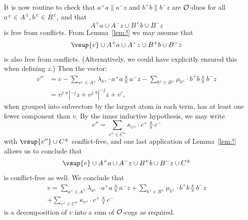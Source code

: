 \begin{claimproof}
It is now routine to check that $a^+ a \parallel a^- z$ and $b^+ b \parallel b^- z$ are $\cal O$-duos for all $a^\pm \in A^\pm, b^\pm \in B^\pm$,
and that 
\[
A^+ a \cup A^- z \cup B^+ b \cup B^- z
\]
is free from conflicts.
From Lemma~\ref{lem:!} we may assume that 
\[
\vsup{v} \cup A^+ a \cup A^- z \cup B^+ b \cup B^- z
\] 
is also free from conflicts.
(Alternatively, we could have explicitly ensured this when defining $z$.)
Then the vector:
\begin{align*}
    v'' &= v
    - \sum_{a^\pm\in A^\pm} \lambda_{a^\pm} \cdot a^+ a \between a^- z 
    - \sum_{b^\pm\in B^\pm} \mu_{b^\pm} \cdot b^+ b \between b^- z  \\
    &= v^{j:a}|^{-j} z + v^{j:b}|^{-j} z + v',
\end{align*}
when grouped into subvectors by the largest atom in each term, has at least one fewer component than $v$.
By the inner inductive hypothesis, we may write
\[
    v'' = \sum_{c^\pm\in C^\pm} \kappa_{c^\pm} \cdot c^+ \between c^-
\]
with $\vsup{v''} \cup C^\pm$ conflict-free, and one
last application of Lemma~\ref{lem:!} allows us to conclude that
\[
    \vsup{v} \cup A^+ a \cup A^- z \cup B^+ b \cup B^- z \cup C^\pm
\]
is conflict-free as well.
We conclude that
\begin{align*}
    v = 
      \sum_{a^\pm\in A^\pm} \lambda_{a^\pm} \cdot a^+ a \between a^- z 
    + \sum_{b^\pm\in B^\pm} \mu_{b^\pm} \cdot b^+ b \between b^- z \\
    + \sum_{c^\pm\in C^\pm} \kappa_{c^\pm} \cdot c^+ \between c^-
\end{align*}
is a decomposition of $v$ into a sum of $\cal O$-cogs as required.
\end{claimproof}

